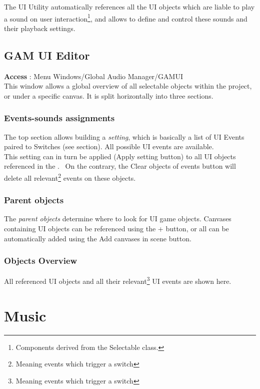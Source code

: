 \documentclass[a4paper,10pt]{article}
\begin{document}
The UI Utility automatically references all the UI objects which are liable to play a sound on user interaction\footnote{Components derived from the Selectable class.}, and allows to define and control these sounds and their playback settings.

\subsection{GAM UI Editor}
\textbf{Access} : Menu Windows/Global Audio Manager/GAMUI\\

This window allows a global overview of all selectable objects within the project, or under a specific canvas. It is split horizontally into three sections.

\subsubsection{Events-sounds assignments}
The top section allows building a \emph{setting}, which is basically a list of UI Events paired to Switches (see  section). All possible UI events are available.\\

This setting can in turn be applied (Apply setting button) to all UI objects referenced in the . \
On the contrary, the Clear objects of events button will delete all relevant\footnote{Meaning events which trigger a switch} events on these objects.

\subsubsection{Parent objects}
The \emph{parent objects} determine where to look for UI game objects. Canvases containing UI objects can be referenced using the + button, or all can be automatically added using the Add canvases in scene button.

\subsubsection{Objects Overview}\label{subsec:objove}
All referenced UI objects and all their relevant\footnote{Meaning events which trigger a switch} UI events are shown here.


\section{Music}
\end{document}
